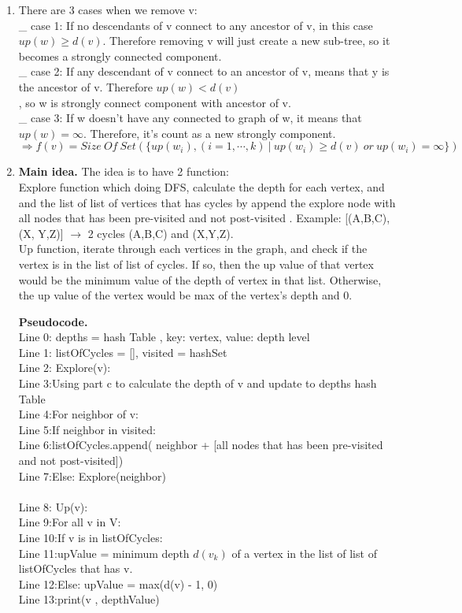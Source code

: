 \documentclass[11pt]{article}
\newenvironment{qparts}{\begin{enumerate}[{(}a{)}]}{\end{enumerate}}
\newcommand{\tab}{\hspace*{2em}}
\begin{document}
\begin{qparts}
\item
There are 3 cases when we remove v:\\
\_ case 1: If no descendants of v connect to any ancestor of v, in this case $up(w) \geqslant  d(v)$. Therefore removing v will just create a new sub-tree, so it becomes a strongly connected component.\\
\_ case 2: If any descendant of v connect to an ancestor of v, means that y is the ancestor of v. Therefore $up(w) < d(v)$\\, so w is strongly connect component with ancestor of v.\\
\_ case 3: If w doesn't have any connected to graph of w, it means that $up(w) = \infty$. Therefore, it's count as a new strongly component.\\
$\Rightarrow \boxed{f(v) = Size\ Of\ Set (\{up(w_i), (i = 1,\cdots,k)\ |\ up(w_i)\geqslant d(v)\ or\ up(w_i) = \infty\})}$\\

\item
\noindent
\textbf{Main idea.}
The idea is to have 2 function:\\
Explore function which doing DFS, calculate the depth for each vertex, and and the list of list of vertices that has cycles by append the explore node with all nodes that has been pre-visited and not post-visited . Example: [(A,B,C), (X, Y,Z)] $\to $ 2 cycles (A,B,C) and (X,Y,Z).\\
Up function, iterate through each vertices in the graph, and check if the vertex is in the list of list of cycles. If so, then the up value of that vertex would be the minimum value of the depth of vertex in that list. Otherwise, the up value of the vertex would be max of the 
vertex's depth and 0.

\noindent
\textbf{Pseudocode.}\\
Line 0: depths = hash Table , key: vertex, value: depth level\\
Line 1: listOfCycles = [], visited = hashSet\\
Line 2: Explore(v):\\
Line 3:\tab Using part c to calculate the depth of v and update to depths hash Table\\
Line 4:\tab For neighbor of v:\\
Line 5:\tab\tab If neighbor in visited:\\
Line 6:\tab\tab\tab listOfCycles.append( neighbor + [all nodes that has been pre-visited and not post-visited])\\
Line 7:\tab\tab Else: Explore(neighbor)\\ 
\\
Line 8: Up(v):\\
Line 9:\tab For all v in V:\\
Line 10:\tab\tab If v is in listOfCycles:\\
Line 11:\tab\tab\tab upValue = minimum depth $d(v_k)$ of a vertex in the list of list of listOfCycles that has v.\\
Line 12:\tab\tab Else: upValue = max(d(v) - 1, 0)\\
Line 13:\tab\tab print(v , depthValue)\\


\end{qparts}
\end{document}
